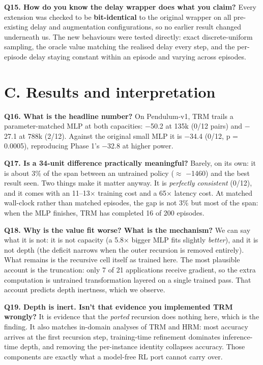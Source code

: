 \documentclass[11pt]{article}
\begin{document}
\textbf{Q15. How do you know the delay wrapper does what you claim?} Every extension was checked to be \textbf{bit-identical} to the original wrapper on all pre-existing delay and augmentation configurations, so no earlier result changed underneath us. The new behaviours were tested directly: exact discrete-uniform sampling, the oracle value matching the realised delay every step, and the per-episode delay staying constant within an episode and varying across episodes.



\section*{C. Results and interpretation}



\textbf{Q16. What is the headline number?} On Pendulum-v1, TRM trails a parameter-matched MLP at both capacities: $-$50.2 at 135k (0/12 pairs) and $-$27.1 at 788k (2/12). Against the original small MLP it is $-$34.4 (0/12, p = 0.0005), reproducing Phase 1's $-$32.8 at higher power.



\textbf{Q17. Is a 34-unit difference practically meaningful?} Barely, on its own: it is about 3\% of the span between an untrained policy ($\approx$ $-$1460) and the best result seen. Two things make it matter anyway. It is \emph{perfectly consistent} (0/12), and it comes with an 11--13$\times$ training cost and a 65$\times$ latency cost. At matched wall-clock rather than matched episodes, the gap is not 3\% but most of the span: when the MLP finishes, TRM has completed 16 of 200 episodes.



\textbf{Q18. Why is the value fit worse? What is the mechanism?} We can say what it is not: it is not capacity (a 5.8$\times$ bigger MLP fits slightly \emph{better}), and it is not depth (the deficit narrows when the outer recursion is removed entirely). What remains is the recursive cell itself as trained here. The most plausible account is the truncation: only 7 of 21 applications receive gradient, so the extra computation is untrained transformation layered on a single trained pass. That account predicts depth inertness, which we observe.



\textbf{Q19. Depth is inert. Isn't that evidence you implemented TRM wrongly?} It is evidence that the \emph{ported} recursion does nothing here, which is the finding. It also matches in-domain analyses of TRM and HRM: most accuracy arrives at the first recursion step, training-time refinement dominates inference-time depth, and removing the per-instance identity collapses accuracy. Those components are exactly what a model-free RL port cannot carry over.
\end{document}
